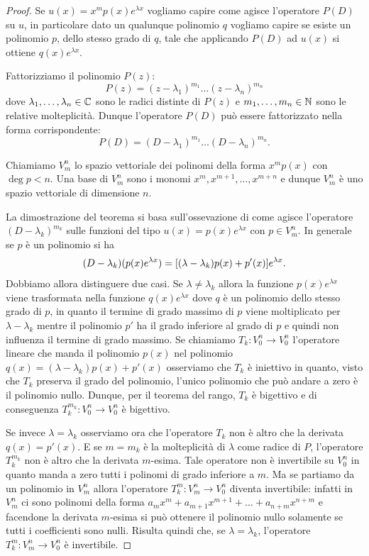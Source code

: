 \begin{proof}
Se $u(x) = x^m p(x) e^{\lambda x}$ vogliamo capire come agisce l'operatore $P(D)$ su $u$, in particolare
dato un qualunque polinomio $q$ vogliamo capire
se esiste un polinomio $p$, dello stesso grado di $q$, tale che applicando $P(D)$ ad $u(x)$ si ottiene $q(x) e^{\lambda x}$.

Fattorizziamo il polinomio $P(z)$:
\[
  P(z) = (z-\lambda_1)^{m_1}\dots (z-\lambda_n)^{m_n}
\]
dove $\lambda_1, \dots, \lambda_n\in \mathbb C$ sono le radici distinte di $P(z)$ e $m_1,\dots,m_n\in \mathbb N$ sono le relative molteplicità. Dunque l'operatore $P(D)$ può essere fattorizzato nella forma corrispondente:
\[
   P(D) = (D-\lambda_1)^{m_1} \dots (D-\lambda_n)^{m_n}.
\]

Chiamiamo $V^n_m$ lo spazio vettoriale dei polinomi della forma $x^m p(x)$ con $\deg p<n$. Una base di $V^n_m$ sono i monomi $x^m, x^{m+1}, \dots, x^{m+n}$ e dunque $V^n_m$ è uno spazio vettoriale di dimensione $n$.

La dimostrazione del teorema si basa sull'ossevazione di come agisce l'operatore $(D-\lambda_k)^{m_k}$ sulle funzioni del tipo $u(x) = p(x) e^{\lambda x}$ con $p\in V^n_m$. In generale se $p$ è un polinomio si ha
\[
 (D-\lambda_k)(p(x)e^{\lambda x})
 = {\left[ (\lambda -\lambda_k)p(x) + p'(x) \right]} e^{\lambda x}.
\]
Dobbiamo allora distinguere due casi. Se $\lambda\neq \lambda_k$ allora la funzione $p(x) e^{\lambda x}$ viene trasformata nella funzione $q(x) e^{\lambda x}$ dove $q$ è un polinomio dello stesso grado di $p$, in quanto il termine di grado massimo di $p$ viene moltiplicato per $\lambda-\lambda_k$ mentre il polinomio $p'$ ha il grado inferiore al grado di $p$ e quindi non influenza il termine di grado massimo. Se chiamiamo $T_k\colon V^n_0 \to V^n_0$ l'operatore lineare che manda il polinomio $p(x)$ nel polinomio $q(x)=(\lambda-\lambda_k) p(x) + p'(x)$ osserviamo che $T_k$ è iniettivo in quanto, visto che $T_k$ preserva il grado del polinomio, l'unico polinomio che può andare a zero è il polinomio nullo. Dunque, per il teorema del rango, $T_k$ è bigettivo e di conseguenza $T_k^{m_k} \colon V^n_0 \to V^n_0$ è bigettivo.

Se invece $\lambda = \lambda_k$ osserviamo ora che l'operatore $T_k$ non è altro che la derivata $q(x) = p'(x)$. E se $m=m_k$ è la molteplicità di $\lambda$ come radice di $P$, l'operatore $T_k^{m_k}$ non è altro che la derivata $m$-esima. Tale operatore non è invertibile su $V^n_0$ in quanto manda a zero tutti i polinomi di grado inferiore a $m$. Ma se partiamo da un polinomio in $V^n_m$ allora l'operatore $T_k^m\colon V^n_m \to V^n_0$ diventa invertibile: infatti in $V^n_m$ ci sono polinomi della forma $a_m x^m + a_{m+1}x^{m+1} + \dots + a_{n+m}x^{n+m}$
e facendone la derivata $m$-esima si può ottenere il polinomio nullo solamente se tutti i coefficienti sono nulli.
Risulta quindi che, se $\lambda = \lambda_k$, l'operatore $T_k^m\colon V^n_m \to V^n_0$ è invertibile.


\end{proof}
